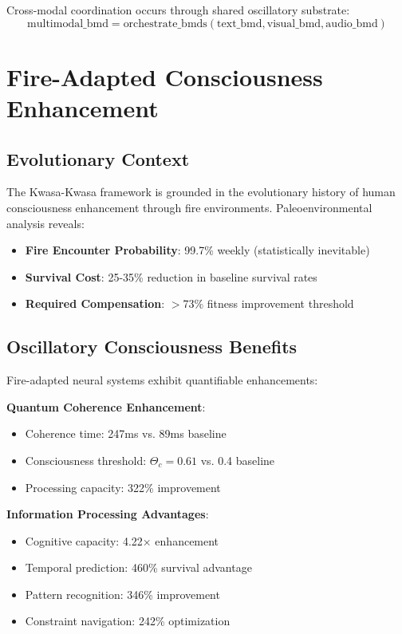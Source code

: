 \documentclass[11pt,twocolumn]{article}
\theoremstyle{remark}
\begin{document}
Cross-modal coordination occurs through shared oscillatory substrate:
\begin{equation}
\text{multimodal\_bmd} = \text{orchestrate\_bmds}(\text{text\_bmd}, \text{visual\_bmd}, \text{audio\_bmd})
\end{equation}

\section{Fire-Adapted Consciousness Enhancement}

\subsection{Evolutionary Context}

The Kwasa-Kwasa framework is grounded in the evolutionary history of human consciousness enhancement through fire environments. Paleoenvironmental analysis reveals:

\begin{itemize}
\item \textbf{Fire Encounter Probability}: 99.7\% weekly (statistically inevitable)
\item \textbf{Survival Cost}: 25-35\% reduction in baseline survival rates
\item \textbf{Required Compensation}: $>$73\% fitness improvement threshold
\end{itemize}

\subsection{Oscillatory Consciousness Benefits}

Fire-adapted neural systems exhibit quantifiable enhancements:

\textbf{Quantum Coherence Enhancement}:
\begin{itemize}
\item Coherence time: 247ms vs. 89ms baseline
\item Consciousness threshold: $\Theta_c = 0.61$ vs. 0.4 baseline
\item Processing capacity: 322\% improvement
\end{itemize}

\textbf{Information Processing Advantages}:
\begin{itemize}
\item Cognitive capacity: 4.22× enhancement
\item Temporal prediction: 460\% survival advantage
\item Pattern recognition: 346\% improvement
\item Constraint navigation: 242\% optimization
\end{itemize}
\end{document}

